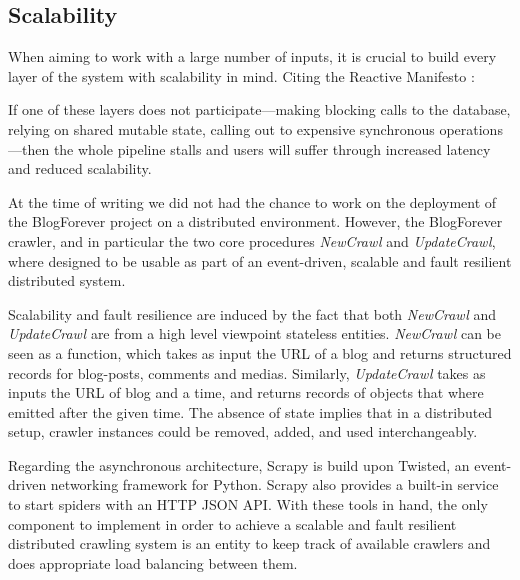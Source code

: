 \subsection{Scalability}
When aiming to work with a large number of inputs, it is crucial to build every layer of the system with scalability in mind. Citing the Reactive Manifesto \cite{thereactivemanifesto2013}:

\begin{quoting}
  If one of these layers does not participate—making blocking calls to the database, relying on shared mutable state, calling out to expensive synchronous operations—then the whole pipeline stalls and users will suffer through increased latency and reduced scalability.
\end{quoting}

At the time of writing we did not had the chance to work on the deployment of the BlogForever project on a distributed environment. However, the BlogForever crawler, and in particular the two core procedures \emph{NewCrawl} and \emph{UpdateCrawl}, where designed to be usable as part of an event-driven, scalable and fault resilient distributed system.


Scalability and fault resilience are induced by the fact that both \emph{NewCrawl} and \emph{UpdateCrawl} are from a high level viewpoint stateless entities. \emph{NewCrawl} can be seen as a function, which takes as input the URL of a blog and returns structured records for blog-posts, comments and medias. Similarly, \emph{UpdateCrawl} takes as inputs the URL of blog and a time, and returns records of objects that where emitted after the given time. The absence of state implies that in a distributed setup, crawler instances could be removed, added, and used interchangeably.

Regarding the asynchronous architecture, Scrapy is build upon Twisted\cite{twisted2013}, an event-driven networking framework for Python. Scrapy also provides a built-in service to start spiders with an HTTP JSON API. With these tools in hand, the only component to implement in order to achieve a scalable and fault resilient distributed crawling system is an entity to keep track of available crawlers and does appropriate load balancing between them.
